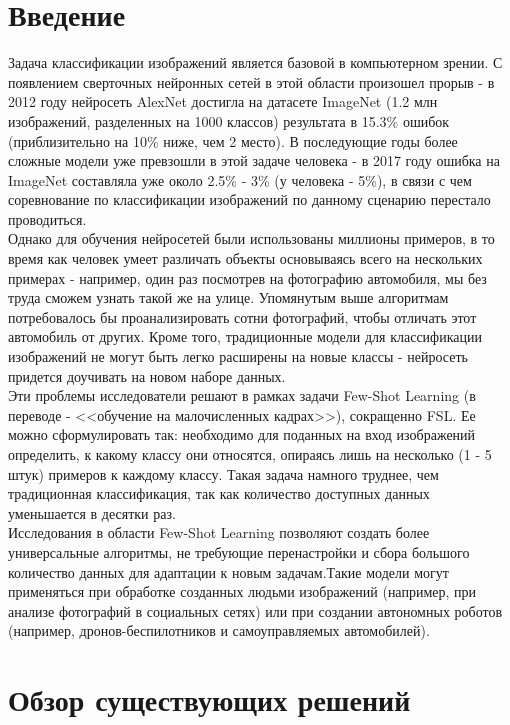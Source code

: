 \documentclass[a4paper, 12pt]{report}
\begin{document}
	\tableofcontents

\chapter{Введение}

Задача классификации изображений является базовой в компьютерном зрении. С появлением сверточных нейронных сетей в этой области произошел прорыв - в 2012 году нейросеть AlexNet достигла на датасете ImageNet (1.2 млн изображений, разделенных на 1000 классов) результата в 15.3\% ошибок (приблизительно на 10\% ниже, чем 2 место). В последующие годы более сложные модели уже превзошли в этой задаче человека - в 2017 году ошибка на ImageNet составляла уже около 2.5\% - 3\% (у человека - 5\%), в связи с чем соревнование по классификации изображений по данному сценарию перестало проводиться. \\

Однако для обучения нейросетей были использованы миллионы примеров, в то время как человек умеет различать объекты основываясь всего на нескольких примерах - например, один раз посмотрев на фотографию автомобиля, мы без труда сможем узнать такой же на улице. Упомянутым выше алгоритмам потребовалось бы проанализировать сотни фотографий, чтобы отличать этот автомобиль от других. Кроме того, традиционные модели для классификации изображений не могут быть легко расширены на новые классы - нейросеть придется доучивать на новом наборе данных. \\

Эти проблемы исследователи решают в рамках задачи Few-Shot Learning (в переводе - <<обучение на малочисленных кадрах>>), сокращенно FSL. Ее можно сформулировать так: необходимо для поданных на вход изображений определить, к какому классу они относятся, опираясь лишь на несколько (1 - 5 штук) примеров к каждому классу. Такая задача намного труднее, чем традиционная классификация, так как количество доступных данных уменьшается в десятки раз. \\

Исследования в области Few-Shot Learning позволяют создать более универсальные алгоритмы, не требующие перенастройки и сбора большого количество данных для адаптации к новым задачам.Такие модели могут применяться при обработке созданных людьми изображений (например, при анализе фотографий в социальных сетях) или при создании автономных роботов (например, дронов-беспилотников и самоуправляемых автомобилей).

\chapter{Обзор существующих решений}
\end{document}
